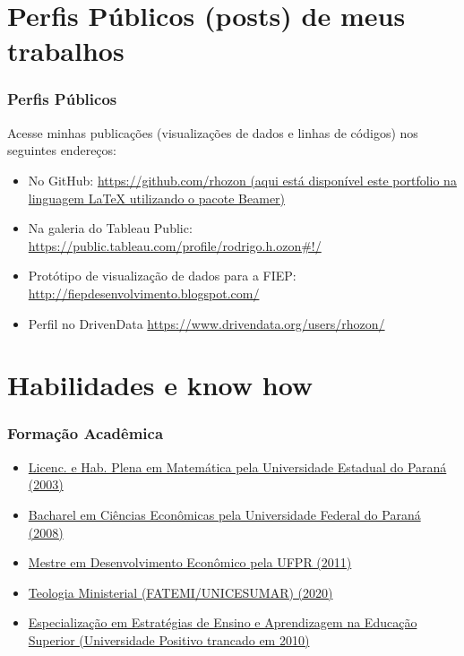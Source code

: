 \documentclass{beamer}
\begin{document}
\section{Perfis Públicos (posts) de meus trabalhos}
\begin{frame}
\frametitle{Perfis Públicos}

\footnotesize
Acesse minhas publicações (visualizações de dados e linhas de códigos) nos seguintes endereços:


\begin{itemize}
    \item No GitHub: \textcolor{blue}{\href{https://github.com/rhozon}{https://github.com/rhozon (aqui está disponível este portfolio na linguagem \LaTeX \hspace{.05cm} utilizando o pacote Beamer)}}
    \item Na galeria do Tableau Public: \textcolor{blue}{\href{https://public.tableau.com/profile/rodrigo.h.ozon#!/}{https://public.tableau.com/profile/rodrigo.h.ozon#!/}}
    \item Protótipo de visualização de dados para a FIEP: \textcolor{blue}{\href{http://fiepdesenvolvimento.blogspot.com/}{http://fiepdesenvolvimento.blogspot.com/}}
    \item Perfil no DrivenData \textcolor{blue}{\href{https://www.drivendata.org/users/rhozon/}{https://www.drivendata.org/users/rhozon/}}
\end{itemize}


\end{frame}
\section{Habilidades e know how}
\begin{frame}
\frametitle{Formação Acadêmica}

\footnotesize
\begin{itemize}
    \item \textcolor{blue}{\href{http://uniaodavitoria.unespar.edu.br/ensino/graduacao/matematica}{Licenc. e Hab. Plena em Matemática pela Universidade Estadual do Paraná (2003)}} 
    \item \textcolor{blue}{\href{http://www.economia.ufpr.br/}{Bacharel em Ciências Econômicas pela Universidade Federal do Paraná (2008)}}
    \item \textcolor{blue}{\href{http://www.sociaisaplicadas.ufpr.br/portal/depecon/pos-graduacao/}{Mestre em Desenvolvimento Econômico pela UFPR (2011)}}
    \item \textcolor{blue}{\href{https://www.fatemi.com.br/}{Teologia Ministerial (FATEMI/UNICESUMAR) (2020)}}
    \item \textcolor{blue}{\href{https://universidade.up.edu.br/pos-graduacao/programa-de-especializacao-docente-no-ensino-da-ciencias/}{Especialização em Estratégias de Ensino e Aprendizagem na Educação Superior (Universidade Positivo trancado em 2010)}}
\end{itemize}


\end{frame}
\end{document}

